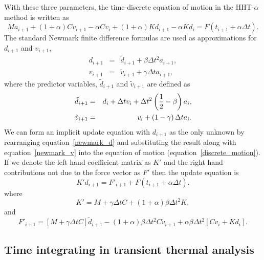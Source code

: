 With these three parameters, the time-discrete equation of motion in the 
HHT-$\alpha$ method is written as
\begin{equation}
\label{discrete_motion}
Ma_{i+1} + (1 + \alpha) C v_{i+1} - \alpha C v_{i} + 
(1 + \alpha) K d_{i+1} - \alpha K d_{i} = F \left( t_{i+1} + {\alpha}{\Delta}t \right).
\end{equation}
The standard Newmark finite difference formulas are used as approximations
for $d_{i+1}$ and $v_{i+1}$,
\begin{eqnarray}
d_{i+1} & = & {\tilde d}_{i+1} + \beta \Delta t^{2} a_{i+1}, \label{newmark_d} \\
v_{i+1} & = & {\tilde v}_{i+1} + \gamma \Delta t a_{i+1}, \label{newmark_v}
\end{eqnarray}
where the predictor variables, ${\tilde d}_{i+1}$ and ${\tilde v}_{i+1}$
are defined as
\begin{eqnarray}
{\tilde d}_{i+1} & = & d_{i} + \Delta t v_{i} + 
                       \Delta t^{2} \left({1 \over 2} - \beta \right) a_{i}, \\
{\tilde v}_{i+1} & = & v_{i} + \left(1 - \gamma \right) \Delta t a_{i}.
\end{eqnarray}
We can form an implicit update equation with $d_{i+1}$ as the only unknown
by rearranging equation~\ref{newmark_d} and substituting the result along
with equation~\ref{newmark_v} into the equation of motion 
(equation~\ref{discrete_motion}).  If we denote the left hand coefficient
matrix as $K'$ and the right hand contributions not due to the force vector
as $F'$ then the update equation is
\begin{equation}
{K'} d_{i+1} = {F'}_{i+1} + F \left( t_{i+1} + \alpha \Delta t \right).
\end{equation}
where
\begin{equation}
K' = M + \gamma \Delta t C + (1 + \alpha) \beta \Delta t^{2} K,
\end{equation}
and
\begin{equation}
{F'}_{i+1} = \left[ M + \gamma \Delta t C \right] {\tilde d}_{i+1} 
     - (1 + \alpha) \beta \Delta t^{2} C {\tilde v}_{i+1} 
     + \alpha \beta \Delta t^{2} \left[ C v_{i} + K d_{i} \right].
\end{equation}

\subsection{Time integrating in transient thermal analysis} 

